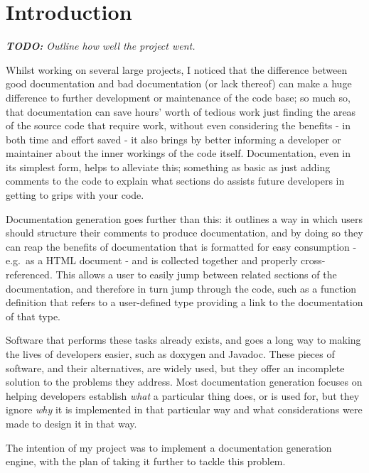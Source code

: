 
\chapter{Introduction}

\emph{\textbf{TODO:} Outline how well the project went.}

Whilst working on several large projects, I noticed that the difference between
good documentation and bad documentation (or lack thereof) can make a huge
difference to further development or maintenance of the code base; so much so,
that documentation can save hours' worth of tedious work just finding the areas
of the source code that require work, without even considering the benefits -
in both time and effort saved - it also brings by better informing a developer
or maintainer about the inner workings of the code itself. Documentation, even
in its simplest form, helps to alleviate this; something as basic as just adding
comments to the code to explain what sections do assists future developers in
getting to grips with your code.

Documentation generation goes further than this: it outlines a way in which
users should structure their comments to produce documentation, and by doing so
they can reap the benefits of documentation that is formatted for easy
consumption - e.g.~as a HTML document - and is collected together and properly
cross-referenced. This allows a user to easily jump between related sections of
the documentation, and therefore in turn jump through the code, such as a
function definition that refers to a user-defined type providing a link to the
documentation of that type.

Software that performs these tasks already exists, and goes a long way to making
the lives of developers easier, such as doxygen\cite{website:doxygen} and
Javadoc\cite{website:javadoc}. These pieces of software, and their alternatives,
are widely used, but they offer an incomplete solution to the problems they
address. Most documentation generation focuses on helping developers establish
\emph{what} a particular thing does, or is used for, but they ignore \emph{why}
it is implemented in that particular way and what considerations were made to
design it in that way.

The intention of my project was to implement a documentation generation engine,
with the plan of taking it further to tackle this problem.

